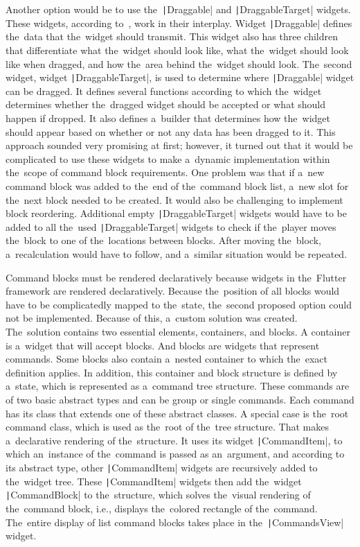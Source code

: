Another option would be to use the~\texttt|Draggable| and \texttt|DraggableTarget| widgets.
These widgets, according to~\cite{a2022_material}, work in their interplay.
Widget \texttt|Draggable| defines the~data that the~widget should transmit.
This widget also has three children that differentiate what the~widget should look like, what the~widget should look like when dragged, and how the~area behind the~widget should look.
The~second widget, widget \texttt|DraggableTarget|, is used to determine where \texttt|Draggable| widget can be dragged.
It defines several functions according to which the~widget determines whether the~dragged widget should be accepted or what should happen if dropped.
It also defines a~builder that determines how the~widget should appear based on whether or not any data has been dragged to it.
This approach sounded very promising at first; however, it turned out that it would be complicated to use these widgets to make a~dynamic implementation within the~scope of command block requirements.
One problem was that if a~new command block was added to the~end of the~command block list, a~new slot for the~next block needed to be created.
It would also be challenging to implement block reordering.
Additional empty \texttt|DraggableTarget| widgets would have to be added to all the~used \texttt|DraggableTarget| widgets to check if the~player moves the~block to one of the~locations between blocks.
After moving the~block, a~recalculation would have to follow, and a~similar situation would be repeated.

Command blocks must be rendered declaratively because widgets in the~Flutter framework are rendered declaratively.
Because the~position of all blocks would have to be complicatedly mapped to the~state, the~second proposed option could not be implemented.
Because of this, a~custom solution was created.
The~solution contains two essential elements, containers, and blocks.
A container is a~widget that will accept blocks.
And blocks are widgets that represent commands.
Some blocks also contain a~nested container to which the~exact definition applies.
In addition, this container and block structure is defined by a~state, which is represented as a~command tree structure.
These commands are of two basic abstract types and can be group or single commands.
Each command has its class that extends one of these abstract classes.
A special case is the~root command class, which is used as the~root of the~tree structure.
That makes a~declarative rendering of the~structure.
It uses its widget \texttt|CommandItem|, to which an~instance of the~command is passed as an~argument, and according to its abstract type, other \texttt|CommandItem| widgets are recursively added to the~widget tree.
These \texttt|CommandItem| widgets then add the~widget \texttt|CommandBlock| to the~structure, which solves the~visual rendering of the~command block, i.e., displays the~colored rectangle of the~command.
The~entire display of list command blocks takes place in the~\texttt|CommandsView| widget.


